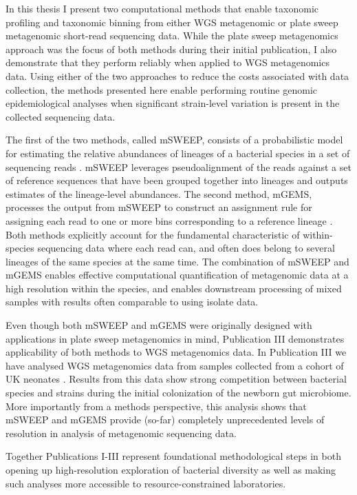 \documentclass[officiallayout]{tktla}
\begin{document}
In this thesis I present two computational methods that enable
taxonomic profiling and taxonomic binning from either WGS metagenomic
or plate sweep metagenomic short-read sequencing data. While the plate
sweep metagenomics approach was the focus of both methods during their
initial publication, I also demonstrate that they perform reliably
when applied to WGS metagenomics data. Using either of the two
approaches to reduce the costs associated with data collection, the
methods presented here enable performing routine genomic
epidemiological analyses when significant strain-level variation is
present in the collected sequencing data.

The first of the two methods, called mSWEEP, consists of a
probabilistic model for estimating the relative abundances of lineages
of a bacterial species in a set of sequencing reads
\citep{maklin_high-resolution_2021}. mSWEEP leverages pseudoalignment
\citep{bray2016near} of the reads against a set of reference sequences
that have been grouped together into lineages and outputs estimates of
the lineage-level abundances. The second method, mGEMS, processes the
output from mSWEEP to construct an assignment rule for assigning each
read to one or more bins corresponding to a reference lineage
\citep{maklin_bacterial_2021}. Both methods explicitly account for the
fundamental characteristic of within-species sequencing data where
each read can, and often does belong to several lineages of the same
species at the same time. The combination of mSWEEP and mGEMS enables
effective computational quantification of metagenomic data at a high
resolution within the species, and enables downstream processing of
mixed samples with results often comparable to using isolate data.

Even though both mSWEEP and mGEMS were originally designed with
applications in plate sweep metagenomics in mind, Publication III
\citep{maklin_strong_2022} demonstrates applicability of both methods
to WGS metagenomics data. In Publication III we have analysed WGS
metagenomics data from samples collected from a cohort of UK neonates
\citep{shao2019stunted}. Results from this data show strong
competition between bacterial species and strains during the initial
colonization of the newborn gut microbiome. More importantly from a
methods perspective, this analysis shows that mSWEEP and mGEMS provide
(so-far) completely unprecedented levels of resolution in analysis of
metagenomic sequencing data.

Together Publications I-III represent foundational
methodological steps in both opening up high-resolution exploration of
bacterial diversity as well as making such analyses more accessible to
resource-constrained laboratories.
\end{document}

